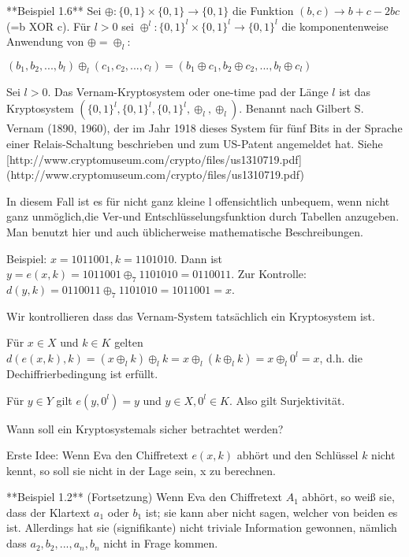 \documentclass[a4paper]{article}
\begin{document}
\begin{multicols}{3}
    **Beispiel 1.6** Sei $\oplus:\{0,1\}\times\{0,1\}\rightarrow\{0,1\}$ die Funktion $(b,c)\rightarrow b+c-2bc$ (=b XOR c).
    Für $l>0$ sei $\oplus^l:\{0,1\}^l\times\{0,1\}^l\rightarrow\{0,1\}^l$ die komponentenweise Anwendung von $\oplus=\oplus_l$:

    $(b_1,b_2,...,b_l)\oplus_l(c_1,c_2,...,c_l) = (b_1\oplus c_1,b_2\oplus c_2,...,b_l\oplus c_l)$

    Sei $l>0$. Das Vernam-Kryptosystem oder one-time pad der Länge $l$ ist das Kryptosystem $(\{0,1\}^l,\{0,1\}^l,\{0,1\}^l,\oplus_l,\oplus_l)$. Benannt nach Gilbert S. Vernam (1890, 1960), der im Jahr 1918 dieses System für fünf Bits in der Sprache einer Relais-Schaltung beschrieben und zum US-Patent angemeldet hat. Siehe [http://www.cryptomuseum.com/crypto/files/us1310719.pdf](http://www.cryptomuseum.com/crypto/files/us1310719.pdf)

    In diesem Fall ist es für nicht ganz kleine l offensichtlich unbequem, wenn nicht ganz unmöglich,die Ver-und Entschlüsselungsfunktion durch Tabellen anzugeben. Man benutzt hier und auch üblicherweise mathematische Beschreibungen.

    Beispiel: $x=1011001,k=1101010$. Dann ist $y=e(x,k)=1011001\oplus_7 1101010 = 0110011$. Zur Kontrolle: $d(y,k) = 0110011\oplus_7 1101010 = 1011001 =x$.

    Wir kontrollieren dass das Vernam-System tatsächlich ein Kryptosystem ist.
    \begin{enumerate*}
        \item Für $x\in X$ und $k\in K$ gelten $d(e(x,k),k)=(x\oplus_l k)\oplus_l k=x\oplus_l(k\oplus_l k) =x\oplus_l 0^l=x$, d.h. die Dechiffrierbedingung ist erfüllt.
        \item  Für $y\in Y$ gilt $e(y,0^l) =y$ und $y\in X,0^l\in K$. Also gilt Surjektivität.
    \end{enumerate*}

    Wann soll ein Kryptosystemals sicher betrachtet werden?

    Erste Idee: Wenn Eva den Chiffretext $e(x,k)$ abhört und den Schlüssel $k$ nicht kennt, so soll sie nicht in der Lage sein, x zu berechnen.

    **Beispiel 1.2** (Fortsetzung) Wenn Eva den Chiffretext $A_1$ abhört, so weiß sie, dass der Klartext $a_1$ oder $b_1$ ist; sie kann aber nicht sagen, welcher von beiden es ist. Allerdings hat sie (signifikante) nicht triviale Information gewonnen, nämlich dass $a_2,b_2,...,a_n,b_n$ nicht in Frage kommen.


\end{multicols}
\end{document}
